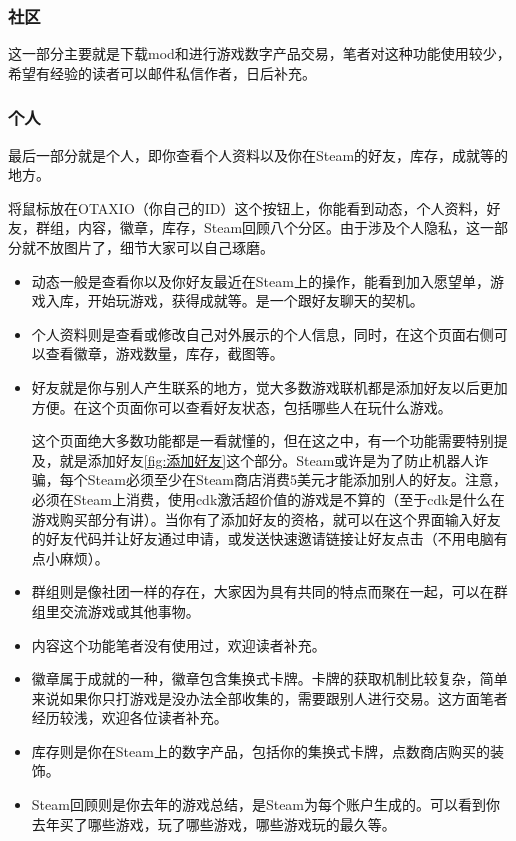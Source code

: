\documentclass{article}
\begin{document}
        \subsubsection{社区}
        这一部分主要就是下载mod和进行游戏数字产品交易，笔者对这种功能使用较少，希望有经验的读者可以邮件私信作者，日后补充。

        \subsubsection{个人}
        最后一部分就是个人，即你查看个人资料以及你在Steam的好友，库存，成就等的地方。

        将鼠标放在OTAXIO（你自己的ID）这个按钮上，你能看到动态，个人资料，好友，群组，内容，徽章，库存，Steam回顾八个分区。由于涉及个人隐私，这一部分就不放图片了，细节大家可以自己琢磨。
        \begin{itemize}
            \item 动态一般是查看你以及你好友最近在Steam上的操作，能看到加入愿望单，游戏入库，开始玩游戏，获得成就等。是一个跟好友聊天的契机。
            \item 个人资料则是查看或修改自己对外展示的个人信息，同时，在这个页面右侧可以查看徽章，游戏数量，库存，截图等。
            \item 好友就是你与别人产生联系的地方，觉大多数游戏联机都是添加好友以后更加方便。在这个页面你可以查看好友状态，包括哪些人在玩什么游戏。

            这个页面绝大多数功能都是一看就懂的，但在这之中，有一个功能需要特别提及，就是添加好友\ref{fig:添加好友}这个部分。Steam或许是为了防止机器人诈骗，每个Steam必须至少在Steam商店消费5美元才能添加别人的好友。注意，必须在Steam上消费，使用cdk激活超价值的游戏是不算的（至于cdk是什么在游戏购买部分有讲）。当你有了添加好友的资格，就可以在这个界面输入好友的好友代码并让好友通过申请，或发送快速邀请链接让好友点击（不用电脑有点小麻烦）。
            \item 群组则是像社团一样的存在，大家因为具有共同的特点而聚在一起，可以在群组里交流游戏或其他事物。
            \item 内容这个功能笔者没有使用过，欢迎读者补充。
            \item 徽章属于成就的一种，徽章包含集换式卡牌。卡牌的获取机制比较复杂，简单来说如果你只打游戏是没办法全部收集的，需要跟别人进行交易。这方面笔者经历较浅，欢迎各位读者补充。
            \item 库存则是你在Steam上的数字产品，包括你的集换式卡牌，点数商店购买的装饰。
            \item Steam回顾则是你去年的游戏总结，是Steam为每个账户生成的。可以看到你去年买了哪些游戏，玩了哪些游戏，哪些游戏玩的最久等。
        \end{itemize}
\end{document}
